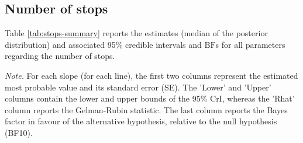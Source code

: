 \documentclass[
  11pt,
  english,
  ,doc,mask,floatsintext]{apa6}
\newenvironment{lltable}{\begin{landscape}\centering\begin{ThreePartTable}}{\end{ThreePartTable}\end{landscape}}
\begin{document}
\hypertarget{number-of-stops}{%
\subsection{Number of stops}\label{number-of-stops}}

Table \ref{tab:stops-summary} reports the estimates (median of the posterior distribution) and associated 95\% credible intervals and \(\text{BF}\)s for all parameters regarding the number of stops.

\begin{lltable}

\begin{TableNotes}[para]
\normalsize{\textit{Note.} For each slope (for each line), the first two columns represent the
    estimated most probable value and its standard error (SE). The 'Lower' and
    'Upper' columns contain the lower and upper bounds of the 95\% CrI, whereas
    the 'Rhat' column reports the Gelman-Rubin statistic. The last column reports
    the Bayes factor in favour of the alternative hypothesis, relative to the
    null hypothesis (BF10).}
\end{TableNotes}

\scriptsize{

}
\end{lltable}
\end{document}
